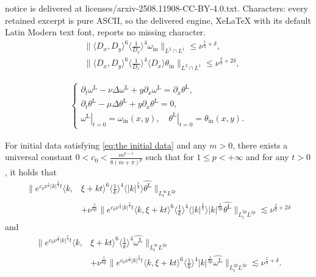 \documentclass[10pt,a4paper]{amsart}
\begin{document}
notice is delivered at licenses/arxiv-2508.11908-CC-BY-4.0.txt. Characters: every retained excerpt is pure ASCII, so the delivered engine, XeLaTeX with its default Latin Modern text font, reports no missing character.
		\begin{equation}\begin{aligned} \label{eq:the initial data}
				&\|\langle D_x, D_y\rangle^6\langle\frac{1}{D_x}\rangle^4 \omega_{\mathrm{in}}\|_{L^2\cap L^1} \leq \nu^{\frac{1}{3}+\delta},  \\
				&\|\langle D_x, D_y\rangle^6\langle\frac{1}{D_x}\rangle^4 \langle D_x \rangle \theta_{\mathrm{in}}\|_{L^2\cap L^1} \leq \nu^{\frac{2}{3} + 2\delta},
		\end{aligned}\end{equation}

	\begin{align} \label{eq:linear equ}
		\left\{\begin{array}{l}
			\partial_t \omega^{\mathrm{L}}-\nu \Delta \omega^{\mathrm{L}}+y \partial_x \omega^{\mathrm{L}}  = \partial_x \theta^{\mathrm{L}}  ,  \\
			\partial_t \theta^{\mathrm{L}}  -  \mu \Delta \theta^{\mathrm{L}}+y \partial_x \theta^{\mathrm{L}}  = 0  ,\\
			\left.\omega^{\mathrm{L}} \right|_{t=0}=\omega_{\text {in}}(x, y),\quad \left.\theta^{\mathrm{L}} \right|_{t=0}= \theta_{\text{in}}(x, y).
		\end{array}\right.
	\end{align}

	\begin{Lem} \label{lem:linear}
		For initial data satisfying \eqref{eq:the initial data} and any $m>0$, there exists a universal constant $0< c_0 < \frac{m^{p-1}}{8(m+\pi)^p}$ such that for $ 1\leq p< +\infty$ and for any $t>0$, it holds that
		\begin{equation*}\begin{aligned} 
				\|  e^{c_0 \nu^\frac13 |k|^\frac23 t} \langle k, & \xi + kt\rangle^6 \langle \frac{1}{k}\rangle^4 \langle |k|^\frac13 \rangle \widehat{\theta^{\mathrm{L}}} \|_{L_t^\infty L^{2p}} \\
				&+ \nu^\frac{1}{6p} \| e^{ c_0 \nu^\frac13 |k|^\frac23 t}    \langle k, \xi + kt\rangle^6 \langle \frac{1}{k}\rangle^4 \langle |k|^\frac13 \rangle |k|^\frac{1}{3p} \widehat{\theta^{\mathrm{L}}} \|_{L_t^{2p} L^{2p}} \lesssim \nu^{\frac{2}{3} + 2\delta} 
		\end{aligned}\end{equation*}
		and
		\begin{equation*}\begin{aligned} 
				\|  e^{c_0 \nu^\frac13 |k|^\frac23 t} \langle k, &\xi + kt\rangle^6 \langle \frac{1}{k}\rangle^4 \widehat{\omega^{\mathrm{L}}} \|_{L_t^\infty L^{2p}} \\
				&+ \nu^\frac{1}{6p} \| e^{ c_0 \nu^\frac13 |k|^\frac23 t}    \langle k, \xi + kt\rangle^6 \langle \frac{1}{k}\rangle^4  |k|^\frac{1}{3p} \widehat{\omega^{\mathrm{L}}} \|_{L_t^{2p} L^{2p}} \lesssim \nu^{\frac{1}{3} +\delta} .
		\end{aligned}\end{equation*}
	\end{Lem}
\end{document}
